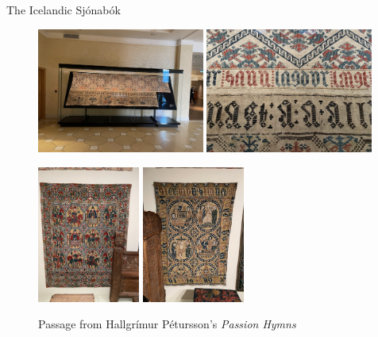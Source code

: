 \documentclass[
    NAME={Dr. Helga Ingimundardóttir},
    EMAIL={helgaingim@hi.is},
    FACULTY={Industrial Engineering},
    TITLE={HiDef Textiles: Reviving Tradition with Innovation},
    SUBTITLE={Empowering Creativity and Sustainability in Textile Production through Digital Transformation},
    SEMINAR={Reykjavík DataBeers},
    DATE={January 25, 2025},
    WIDE={true}
]{HI-LaTeX/hi-beamer}
\begin{document}
\begin{frame}[allowframebreaks]{The Icelandic Sjónabók}
        \begin{figure}
            \caption{Passage from Hallgrímur Pétursson's  \textit{Passion Hymns}}
            \includegraphics[width=0.49\textwidth]{include/passiusalmur.jpg}
            \includegraphics[width=0.49\textwidth]{include/passiusalmur-zoom.jpg}


            \framebreak
            \includegraphics[width=0.3\textwidth]{include/riddarateppi.jpg}
            \includegraphics[width=0.3\textwidth]{include/ævijesú.jpg}
        \end{figure}


\end{frame}
\end{document}
